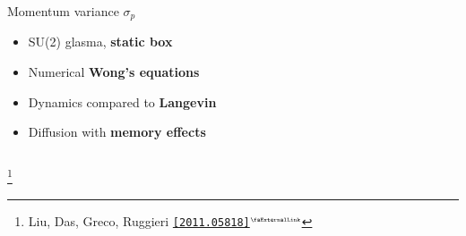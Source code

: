 \documentclass[aspectratio=169,11pt,usenames,dvipsnames]{beamer}
\renewcommand{\thefootnote}{\color{customblue}\faPaperPlaneO}
\newcommand\blfootnote[1]{%
  \begingroup
  \renewcommand\thefootnote{}\footnote{#1}%
  \addtocounter{footnote}{-1}%
  \endgroup
}
\begin{document}
\begin{frame}[t]
\begin{columns}[onlytextwidth,t]
        \begin{center}
            {\Large\color{palteal} Momentum variance $\sigma_p$ \\[10pt]}
            \footnotesize
                \begin{itemize}
                    \item {\color{lightgray}SU(2) glasma, {\bfseries static box}}
                    \item {\color{lightgray}Numerical {\bfseries Wong's equations}}
                    \item {\color{lightgray}Dynamics compared to {\bfseries Langevin}}
                    \item {\color{lightgray}Diffusion with {\bfseries memory effects}}
                \end{itemize}
        \end{center}
    \end{columns}
    \blfootnote{\scriptsize Liu, Das, Greco, Ruggieri \href{https://arxiv.org/abs/2011.05818}{\color{palgold}\texttt{[2011.05818]}$^\text{\tiny\faExternalLink}$}}
\end{frame}


\end{document}
